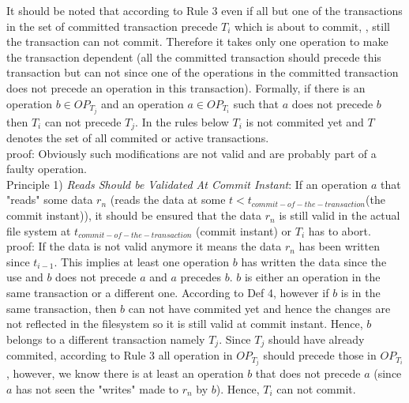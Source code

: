\documentclass[a4paper, 11pt]{article}
\begin{document}
It should be noted that according to Rule 3 even if all but one of the transactions in the set of committed transaction precede $T_i$ which is about to commit, , still the transaction can not commit. Therefore it takes only one operation to make the transaction dependent (all the committed transaction should precede this transaction but can not since one of the operations in the committed transaction does not precede an operation in this transaction). Formally, if there is an operation $b \in OP_{T_j}$ and an operation $a \in OP_{T_i}$ such that $a$ does not precede $b$ then $T_i$ can not precede $T_j$. In the rules below $T_i$ is not commited yet and $T$ denotes the set of all commited or active transactions. \\





proof: Obviously such modifications are not valid and are probably part of a faulty operation.\\


Principle 1) \emph{Reads Should be Validated At Commit Instant}: If an operation $a$ that "reads" some data $r_n$ (reads the data at some $t < t_{commit-of-the-transaction}$(the commit instant)), it should be ensured that the data $r_n$ is still valid in the actual file system at $t_{commit-of-the-transaction}$ (commit instant) or $T_i$ has to abort.\\

proof: If the data is not valid anymore it means the data $r_n$ has been written since $t_{i-1}$. This implies at least one operation $b$ has written the data since the use and $b$ does not precede $a$ and $a$ precedes $b$. $b$ is either an operation in the same transaction or a different one. According to Def 4, however if $b$ is in the same transaction, then $b$ can not have commited yet and hence the changes are not reflected in the filesystem so it is still valid at commit instant. Hence, $b$ belongs to a different transaction namely $T_j$. Since $T_j$ should have already commited, according to Rule 3 all operation in $OP_{T_j}$ should precede those in $OP_{T_i}$, however, we know there is at least an operation $b$ that does not precede $a$ (since $a$ has not seen the "writes" made to $r_n$ by $b$). Hence, $T_i$ can not commit.\\
\end{document}
